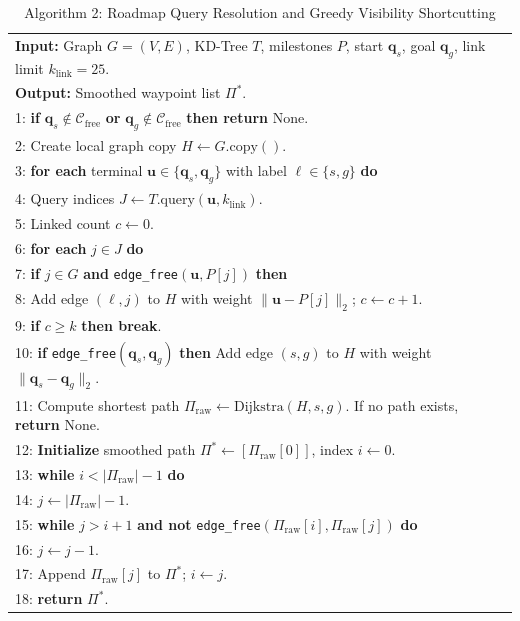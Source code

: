 \documentclass[12pt,a4paper]{article}
\begin{document}
\begin{table}[H]
\centering
\caption{Algorithm 2: Roadmap Query Resolution and Greedy Visibility Shortcutting}
\label{alg:prm_query}
\begin{tabular}{|p{\dimexpr\linewidth-2\tabcolsep-2\fboxrule\relax}|}
\hline
\textbf{Input:} Graph $G=(V, E)$, KD-Tree $T$, milestones $P$, start $\mathbf{q}_s$, goal $\mathbf{q}_g$, link limit $k_{\text{link}} = 25$. \\
\textbf{Output:} Smoothed waypoint list $\Pi^*$. \\ \hline
1: \textbf{if} $\mathbf{q}_s \notin \mathcal{C}_{\text{free}}$ \textbf{or} $\mathbf{q}_g \notin \mathcal{C}_{\text{free}}$ \textbf{then return} $\text{None}$. \\
2: Create local graph copy $H \leftarrow G.\text{copy}()$. \\
3: \textbf{for each} terminal $\mathbf{u} \in \{\mathbf{q}_s, \mathbf{q}_g\}$ with label $\ell \in \{s, g\}$ \textbf{do} \\
4: \quad Query indices $J \leftarrow T.\text{query}(\mathbf{u}, k_{\text{link}})$. \\
5: \quad Linked count $c \leftarrow 0$. \\
6: \quad \textbf{for each} $j \in J$ \textbf{do} \\
7: \qquad \textbf{if} $j \in G$ \textbf{and} \texttt{edge\_free}$(\mathbf{u}, P[j])$ \textbf{then} \\
8: \qquad \quad Add edge $(\ell, j)$ to $H$ with weight $\|\mathbf{u} - P[j]\|_2$; $c \leftarrow c + 1$. \\
9: \qquad \quad \textbf{if} $c \geq k$ \textbf{then break}. \\
10: \textbf{if} \texttt{edge\_free}$(\mathbf{q}_s, \mathbf{q}_g)$ \textbf{then} Add edge $(s, g)$ to $H$ with weight $\|\mathbf{q}_s - \mathbf{q}_g\|_2$. \\
11: Compute shortest path $\Pi_{\text{raw}} \leftarrow \text{Dijkstra}(H, s, g)$. If no path exists, \textbf{return} $\text{None}$. \\
12: %
\textbf{Initialize} smoothed path $\Pi^* \leftarrow [\Pi_{\text{raw}}[0]]$, index $i \leftarrow 0$. \\
13: \textbf{while} $i < |\Pi_{\text{raw}}| - 1$ \textbf{do} \\
14: \quad $j \leftarrow |\Pi_{\text{raw}}| - 1$. \\
15: \quad \textbf{while} $j > i + 1$ \textbf{and not} \texttt{edge\_free}$(\Pi_{\text{raw}}[i], \Pi_{\text{raw}}[j])$ \textbf{do} \\
16: \qquad $j \leftarrow j - 1$. \\
17: \quad Append $\Pi_{\text{raw}}[j]$ to $\Pi^*$; $i \leftarrow j$. \\
18: \textbf{return} $\Pi^*$. \\ \hline
\end{tabular}
\end{table}
\end{document}
